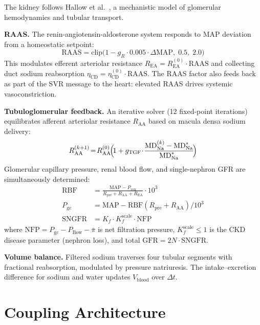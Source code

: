 \documentclass[10pt,twocolumn]{article}
\begin{document}
The kidney follows Hallow et al.\ \citeyearpar{hallow2017}, a mechanistic model of glomerular hemodynamics and tubular transport.

\textbf{RAAS.} The renin-angiotensin-aldosterone system responds to MAP deviation from a homeostatic setpoint:
\begin{equation}
\text{RAAS} = \text{clip}\bigl(1 - g_R \cdot 0.005 \cdot \Delta\text{MAP},\; 0.5,\; 2.0\bigr)
\label{eq:raas}
\end{equation}
This modulates efferent arteriolar resistance $R_{\text{EA}} = R_{\text{EA}}^{(0)} \cdot \text{RAAS}$ and collecting duct sodium reabsorption $\eta_{\text{CD}} = \eta_{\text{CD}}^{(0)} \cdot \text{RAAS}$. The RAAS factor also feeds back as part of the SVR message to the heart: elevated RAAS drives systemic vasoconstriction.

\textbf{Tubuloglomerular feedback.} An iterative solver (12 fixed-point iterations) equilibrates afferent arteriolar resistance $R_{\text{AA}}$ based on macula densa sodium delivery:
\begin{equation}
R_{\text{AA}}^{(k+1)} \!=\! R_{\text{AA}}^{(0)} \!\Bigl(\!1 + g_{\text{TGF}} \!\cdot\! \frac{\text{MD}_{\text{Na}}^{(k)} - \text{MD}_{\text{Na}}^{*}}{\text{MD}_{\text{Na}}^{*}}\!\Bigr)
\label{eq:tgf}
\end{equation}
Glomerular capillary pressure, renal blood flow, and single-nephron GFR are simultaneously determined:
\begin{align}
\text{RBF} &= \frac{\text{MAP} - P_{\text{ven}}}{R_{\text{pre}} + R_{\text{AA}} + R_{\text{EA}}} \cdot 10^3 \label{eq:rbf}\\
P_{\text{gc}} &= \text{MAP} - \text{RBF}(R_{\text{pre}} \!+\! R_{\text{AA}}) / 10^3 \label{eq:pgc}\\
\text{SNGFR} &= K_f \cdot K_f^{\text{scale}} \cdot \text{NFP} \label{eq:sngfr}
\end{align}
where $\text{NFP} = P_{\text{gc}} - P_{\text{Bow}} - \bar{\pi}$ is net filtration pressure, $K_f^{\text{scale}} \leq 1$ is the CKD disease parameter (nephron loss), and total $\text{GFR} = 2N \cdot \text{SNGFR}$.

\textbf{Volume balance.} Filtered sodium traverses four tubular segments with fractional reabsorption, modulated by pressure natriuresis. The intake--excretion difference for sodium and water updates $V_{\text{blood}}$ over $\Delta t$.

\section{Coupling Architecture}
\label{sec:coupling}
\end{document}
